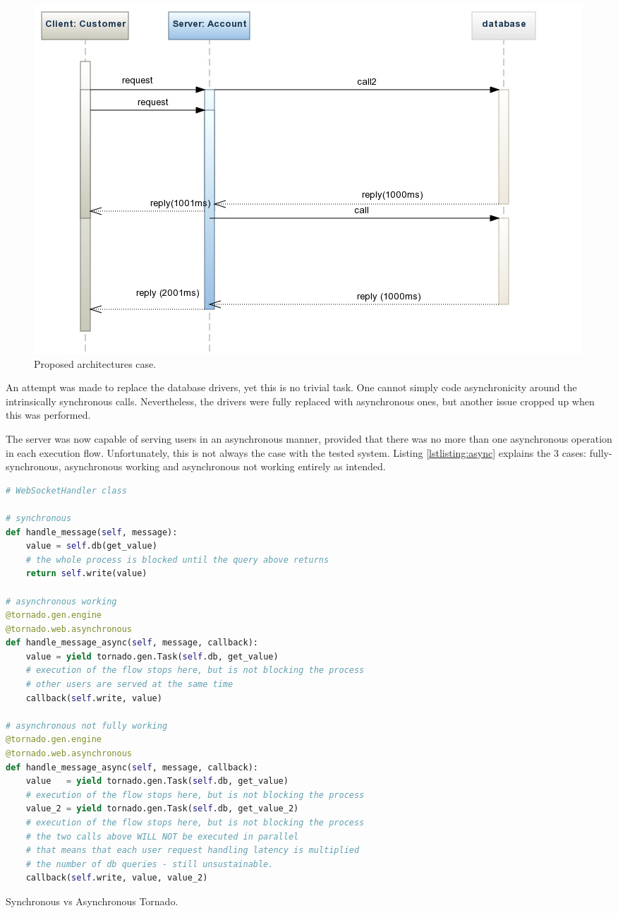 \documentclass{uvamscse}
\begin{document}
\begin{figure}[H]
\centering
\includegraphics[scale=0.5]{case2}
\caption{Proposed architectures case.}
\label{figure:case2}
\end{figure}
An attempt was made to replace the database drivers, yet this is no trivial task. One cannot simply code asynchronicity around the intrinsically synchronous calls. Nevertheless, the drivers were fully replaced with asynchronous ones, but another issue cropped up when this was performed.

The server was now capable of serving users in an asynchronous manner, provided that there was no more than one asynchronous operation in each execution flow. Unfortunately, this is not always the case with the tested system. Listing \ref{lstlisting:async} explains the 3 cases: fully-synchronous, asynchronous working and asynchronous not working entirely as intended.

\begin{sourcecode}[H]
\begin{lstlisting}[style=mono, language=Python]
# WebSocketHandler class

# synchronous
def handle_message(self, message):
    value = self.db(get_value)
    # the whole process is blocked until the query above returns
    return self.write(value)

# asynchronous working
@tornado.gen.engine
@tornado.web.asynchronous
def handle_message_async(self, message, callback):
    value = yield tornado.gen.Task(self.db, get_value)
    # execution of the flow stops here, but is not blocking the process
    # other users are served at the same time
    callback(self.write, value)

# asynchronous not fully working
@tornado.gen.engine
@tornado.web.asynchronous
def handle_message_async(self, message, callback):
    value   = yield tornado.gen.Task(self.db, get_value)
    # execution of the flow stops here, but is not blocking the process
    value_2 = yield tornado.gen.Task(self.db, get_value_2)
    # execution of the flow stops here, but is not blocking the process
    # the two calls above WILL NOT be executed in parallel
    # that means that each user request handling latency is multiplied
    # the number of db queries - still unsustainable.
    callback(self.write, value, value_2)
\end{lstlisting}
\caption{Synchronous vs Asynchronous Tornado.}
\label{lstlisting:async}
\end{sourcecode}
\end{document}
